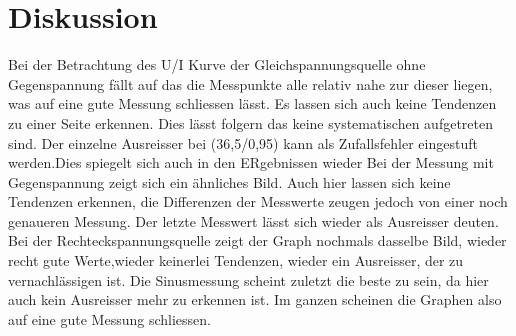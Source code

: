 \section{Diskussion}
\label{sec:Diskussion}

Bei der Betrachtung des U/I Kurve der Gleichspannungsquelle ohne Gegenspannung
fällt auf das die Messpunkte alle relativ nahe zur dieser liegen, was auf eine gute
Messung schliessen lässt. Es lassen sich auch keine
Tendenzen zu einer Seite erkennen. Dies lässt folgern das keine systematischen
aufgetreten sind. Der einzelne Ausreisser bei (36,5/0,95) kann als Zufallsfehler
eingestuft werden.Dies spiegelt sich auch in den ERgebnissen wieder Bei der Messung mit Gegenspannung zeigt sich ein ähnliches Bild.
 Auch hier lassen sich keine Tendenzen erkennen, die Differenzen der Messwerte zeugen
jedoch von einer noch genaueren Messung. Der letzte Messwert lässt sich wieder als
Ausreisser deuten. Bei der Rechteckspannungsquelle zeigt der Graph nochmals dasselbe
Bild, wieder recht gute Werte,wieder keinerlei Tendenzen, wieder ein Ausreisser, der
zu vernachlässigen ist. Die Sinusmessung scheint zuletzt die beste zu sein, da hier auch
kein Ausreisser mehr zu erkennen ist. Im ganzen scheinen die Graphen also auf eine
gute Messung schliessen.
